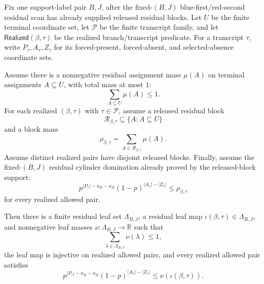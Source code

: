 \begin{helper}
Fix one support-label pair \(B,J\), after the fixed-\((B,J)\)
blue-first/red-second residual scan has already supplied released residual
blocks.  Let \(U\) be the finite terminal coordinate set, let
\(\mathcal P\) be the finite transcript family, and let
\(\mathsf{Realized}(\beta,\tau)\) be the realized branch/transcript
predicate.  For a transcript \(\tau\), write \(P_\tau,A_\tau,Z_\tau\) for
its forced-present, forced-absent, and selected-absence coordinate sets.

Assume there is a nonnegative residual assignment mass \(\mu(A)\) on
terminal assignments \(A\subseteq U\), with total mass at most \(1\):
\[
\sum_{A\subseteq U}\mu(A)\le 1.
\]
For each realized \((\beta,\tau)\) with \(\tau\in\mathcal P\), assume a
released residual block
\[
\mathcal R_{\beta,\tau}\subseteq \{A:A\subseteq U\}
\]
and a block mass
\[
\rho_{\beta,\tau}
  =\sum_{A\in\mathcal R_{\beta,\tau}}\mu(A).
\]
Assume distinct realized pairs have disjoint released blocks.  Finally,
assume the fixed-\((B,J)\) residual cylinder domination already proved by
the released-block support:
\[
p^{|P_\tau|-u_R-u_B}(1-p)^{|A_\tau|-|Z_\tau|}
  \le \rho_{\beta,\tau}
\]
for every realized allowed pair.

Then there is a finite residual leaf set \(\Lambda_{B,J}\), a residual leaf
map \(\iota(\beta,\tau)\in\Lambda_{B,J}\), and nonnegative leaf masses
\(\nu:\Lambda_{B,J}\to\mathbb R\) such that
\[
\sum_{\lambda\in\Lambda_{B,J}}\nu(\lambda)\le1,
\]
the leaf map is injective on realized allowed pairs, and every realized
allowed pair satisfies
\[
p^{|P_\tau|-u_R-u_B}(1-p)^{|A_\tau|-|Z_\tau|}
  \le \nu(\iota(\beta,\tau)).
\]
\end{helper}
